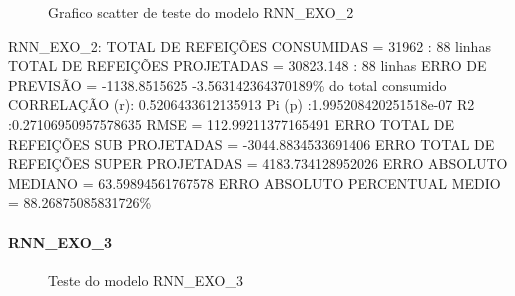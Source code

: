 \documentclass[	12pt, Times, openright, twoside, a4paper, english, brazil]{abntex2}
\begin{document}
                \begin{figure}[!ht]
                  \caption{Grafico scatter de teste do modelo RNN\_EXO\_2 \label{fig:case1_rnn_exo_2_test_scatter} }
                \end{figure}
                RNN\_EXO\_2:
                TOTAL DE REFEIÇÕES CONSUMIDAS = 31962 : 88 linhas\newline
                TOTAL DE REFEIÇÕES PROJETADAS = 30823.148 : 88 linhas\newline
                ERRO DE PREVISÃO = -1138.8515625 -3.563142364370189\% do total consumido\newline
                CORRELAÇÃO (r): 0.5206433612135913 Pi (p) :1.995208420251518e-07 R2 :0.27106950957578635\newline
                RMSE = 112.99211377165491\newline
                ERRO TOTAL DE REFEIÇÕES SUB PROJETADAS = -3044.8834533691406\newline
                ERRO TOTAL DE REFEIÇÕES SUPER PROJETADAS = 4183.734128952026\newline
                ERRO ABSOLUTO MEDIANO = 63.59894561767578\newline
                ERRO ABSOLUTO PERCENTUAL MEDIO = 88.26875085831726\%\newline
              \paragraph{RNN\_EXO\_3}
                \begin{figure}[!ht]
                  \caption{Teste do modelo RNN\_EXO\_3 \label{fig:case1_rnn_exo_3_test} }
                \end{figure}
\end{document}
